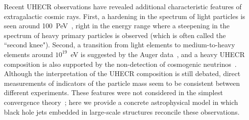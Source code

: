 \documentclass[aps,prd,onecolumn,superscriptaddress,11pt]{revtex4}
\begin{document}
Recent UHECR observations have revealed additional characteristic features of extragalactic cosmic rays. First, a hardening in the spectrum of light particles is seen around 100~PeV~\cite{::2013dga,Buitink:2016nkf}, right in the energy range where a steepening in the spectrum of heavy primary particles is observed (which is often called the ``second knee"). 
Second, a transition from light elements to medium-to-heavy elements around ${10}^{19}$~eV is suggested by the Auger data~\cite{Aab:2015bza}, and a heavy UHECR composition is also supported by the non-detection of cosmogenic neutrinos~\cite{2016arXiv160705886I}. Although the interpretation of the UHECR composition is still debated, direct measurements of indicators of the particle mass seem to be consistent between different experiments.
These features were not considered in the simplest convergence theory~\cite{2016PhRvD..94j3006M}; here we provide a concrete astrophysical model in which black hole jets embedded in large-scale structures reconcile these observations.
 
\end{document}

